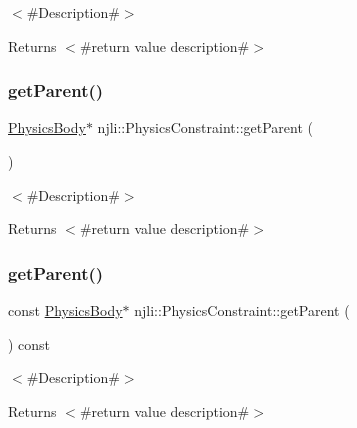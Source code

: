 $<$\#\+Description\#$>$

\begin{DoxyReturn}{Returns}
$<$\#return value description\#$>$ 
\end{DoxyReturn}
\mbox{\label{classnjli_1_1_physics_constraint_aea662a8e9b6eb74c2f772d35226aa79b}} 
\subsubsection{\texorpdfstring{get\+Parent()}{getParent()}\hspace{0.1cm}{\footnotesize\ttfamily [1/2]}}
{\footnotesize\ttfamily \mbox{\hyperlink{classnjli_1_1_physics_body}{Physics\+Body}}$\ast$ njli\+::\+Physics\+Constraint\+::get\+Parent (\begin{DoxyParamCaption}{ }\end{DoxyParamCaption})}

$<$\#\+Description\#$>$

\begin{DoxyReturn}{Returns}
$<$\#return value description\#$>$ 
\end{DoxyReturn}
\mbox{\label{classnjli_1_1_physics_constraint_a206984148059aa74e81ee7a3ae09ecb5}} 
\subsubsection{\texorpdfstring{get\+Parent()}{getParent()}\hspace{0.1cm}{\footnotesize\ttfamily [2/2]}}
{\footnotesize\ttfamily const \mbox{\hyperlink{classnjli_1_1_physics_body}{Physics\+Body}}$\ast$ njli\+::\+Physics\+Constraint\+::get\+Parent (\begin{DoxyParamCaption}{ }\end{DoxyParamCaption}) const}

$<$\#\+Description\#$>$

\begin{DoxyReturn}{Returns}
$<$\#return value description\#$>$ 
\end{DoxyReturn}
\mbox{\label{classnjli_1_1_physics_constraint_ac4ca71716ed832be357f15f8262c8448}} 
